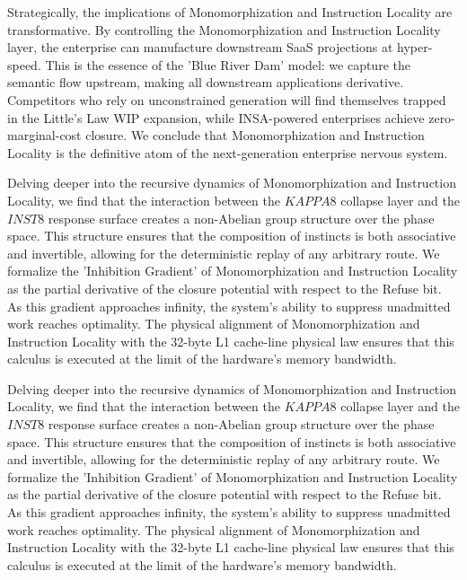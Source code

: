 \documentclass[12pt,a4paper,oneside]{book}
\begin{document}
Strategically, the implications of Monomorphization and Instruction Locality are transformative. By controlling the Monomorphization and Instruction Locality layer, the enterprise can manufacture downstream SaaS projections at hyper-speed. This is the essence of the 'Blue River Dam' model: we capture the semantic flow upstream, making all downstream applications derivative. Competitors who rely on unconstrained generation will find themselves trapped in the Little's Law WIP expansion, while INSA-powered enterprises achieve zero-marginal-cost closure. We conclude that Monomorphization and Instruction Locality is the definitive atom of the next-generation enterprise nervous system. 

Delving deeper into the recursive dynamics of Monomorphization and Instruction Locality, we find that the interaction between the $KAPPA8$ collapse layer and the $INST8$ response surface creates a non-Abelian group structure over the phase space. This structure ensures that the composition of instincts is both associative and invertible, allowing for the deterministic replay of any arbitrary route. We formalize the 'Inhibition Gradient' of Monomorphization and Instruction Locality as the partial derivative of the closure potential with respect to the Refuse bit. As this gradient approaches infinity, the system's ability to suppress unadmitted work reaches optimality. The physical alignment of Monomorphization and Instruction Locality with the 32-byte L1 cache-line physical law ensures that this calculus is executed at the limit of the hardware's memory bandwidth. 

Delving deeper into the recursive dynamics of Monomorphization and Instruction Locality, we find that the interaction between the $KAPPA8$ collapse layer and the $INST8$ response surface creates a non-Abelian group structure over the phase space. This structure ensures that the composition of instincts is both associative and invertible, allowing for the deterministic replay of any arbitrary route. We formalize the 'Inhibition Gradient' of Monomorphization and Instruction Locality as the partial derivative of the closure potential with respect to the Refuse bit. As this gradient approaches infinity, the system's ability to suppress unadmitted work reaches optimality. The physical alignment of Monomorphization and Instruction Locality with the 32-byte L1 cache-line physical law ensures that this calculus is executed at the limit of the hardware's memory bandwidth. 
\end{document}

